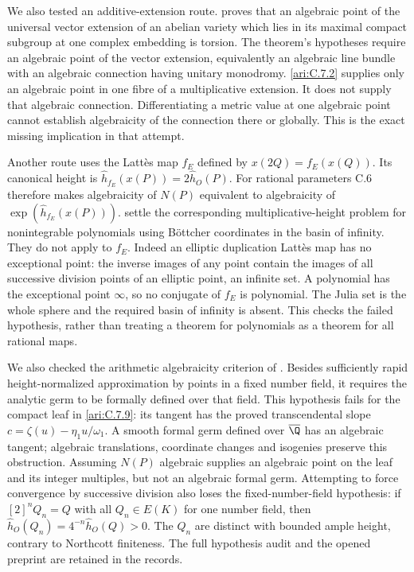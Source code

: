 We also tested an additive-extension route.
\citet[Theorem 3.1.2]{bost2009} proves that an algebraic point
of the universal vector extension of an abelian variety which
lies in its maximal compact subgroup at one complex embedding
is torsion. The theorem's hypotheses require an algebraic
point of the vector extension, equivalently an algebraic line
bundle with an algebraic connection having unitary monodromy.
\ref{ari:C.7.2} supplies only an algebraic point in one fibre of a
multiplicative extension. It does not supply that algebraic
connection. Differentiating a metric value at one algebraic
point cannot establish algebraicity of the connection there
or globally. This is the exact missing implication in that
attempt.

Another route uses the Latt\`es map $f_E$ defined by
$x(2Q)=f_E(x(Q))$. Its canonical height is
$\widehat h_{f_E}(x(P))=2\widehat h_O(P)$. For rational
parameters C.6 therefore makes algebraicity of $N(P)$
equivalent to algebraicity of
$\exp(\widehat h_{f_E}(x(P)))$.
\citet[Theorem 1.4 and Corollary 1.6]{nguyen2023} settle the
corresponding multiplicative-height problem for nonintegrable
polynomials using B\"ottcher coordinates in the basin of
infinity. They do not apply to $f_E$. Indeed an elliptic
duplication Latt\`es map has no exceptional point: the inverse
images of any point contain the images of all successive
division points of an elliptic point, an infinite set. A
polynomial has the exceptional point $\infty$, so no conjugate
of $f_E$ is polynomial. The Julia set is the whole sphere
and the required basin of infinity is absent. This checks
the failed hypothesis, rather than treating a theorem for
polynomials as a theorem for all rational maps.

We also checked the arithmetic algebraicity criterion of
\citet[Theorems 1.3 and 2.3]{xie2024algebraicity}.
Besides sufficiently rapid height-normalized approximation by
points in a fixed number field, it requires the analytic germ
to be formally defined over that field. This hypothesis fails
for the compact leaf in \ref{ari:C.7.9}: its tangent has the proved
transcendental slope
$c=\zeta(u)-\eta_1u/\omega_1$.
A smooth formal germ defined over $\overline{\Q}$ has an
algebraic tangent; algebraic translations, coordinate changes
and isogenies preserve this obstruction. Assuming $N(P)$
algebraic supplies an algebraic point on the leaf and its
integer multiples, but not an algebraic formal germ. Attempting
to force convergence by successive division also loses the
fixed-number-field hypothesis: if $[2]^nQ_n=Q$ with all
$Q_n\in E(K)$ for one number field, then
$\widehat h_O(Q_n)=4^{-n}\widehat h_O(Q)>0$.
The $Q_n$ are distinct with bounded ample height, contrary to
Northcott finiteness. The full hypothesis audit and the opened
preprint are retained in the records.

